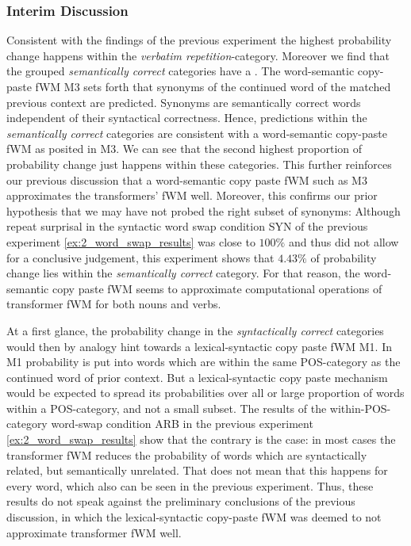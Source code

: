 \subsubsection{Interim Discussion}

Consistent with the findings of the previous experiment the highest probability change happens within the \textit{verbatim repetition}-category.
Moreover we find that the grouped \textit{semantically correct} categories have a .
The word-semantic copy-paste fWM M3 sets forth that synonyms of the continued word of the matched previous context are predicted.
Synonyms are semantically correct words independent of their syntactical correctness.
Hence, predictions within the \textit{semantically correct} categories are consistent with a word-semantic copy-paste fWM as posited in M3.
We can see that the second highest proportion of probability change just happens within these categories.
This further reinforces our previous discussion that a word-semantic copy paste fWM such as M3 approximates the transformers' fWM well.
Moreover, this confirms our prior hypothesis that we may have not probed the right subset of synonyms:
Although repeat surprisal in the syntactic word swap condition SYN of the previous experiment \ref{ex:2_word_swap_results} was close to $100\%$ and thus did not allow for a conclusive judgement, this experiment shows that $4.43\%$ of probability change lies within the \textit{semantically correct} category.
For that reason, the word-semantic copy paste fWM seems to approximate computational operations of transformer fWM for both nouns and verbs.

At a first glance, the probability change in the \textit{syntactically correct} categories would then by analogy hint towards a lexical-syntactic copy paste fWM M1.
In M1 probability is put into words which are within the same POS-category as the continued word of prior context.
But a lexical-syntactic copy paste mechanism would be expected to spread its probabilities over all or large proportion of words within a POS-category, and not a small subset.
The results of the within-POS-category word-swap condition ARB in the previous experiment \ref{ex:2_word_swap_results} show that the contrary is the case: in most cases the transformer fWM reduces the probability of words which are syntactically related, but semantically unrelated.
That does not mean that this happens for every word, which also can be seen in the previous experiment.
Thus, these results do not speak against the preliminary conclusions of the previous discussion, in which the lexical-syntactic copy-paste fWM was deemed to not approximate transformer fWM well.

